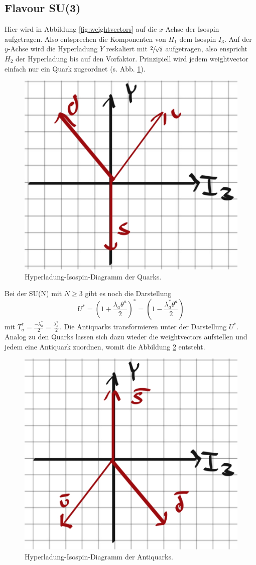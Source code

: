 \documentclass[
  captions=tableheading,  %
  titlepage=firstiscover, %
]{scrartcl}
\begin{document}
\subsection{Flavour SU(3)}
Hier wird in Abbildung \ref{fig:weightvectors} auf die $x$-Achse der Isospin 
aufgetragen.
Also entsprechen die Komponenten von $H_1$ dem Isospin $I_3$.
Auf der $y$-Achse wird die Hyperladung $Y$ reskaliert mit $\sfrac{2}{\sqrt{3}}$ aufgetragen, also enspricht 
$H_2$ der Hyperladung bis auf den Vorfaktor. 
Prinzipiell wird jedem weightvector einfach nur ein Quark zugeordnet (s. Abb. \ref{fig:quark}).
\begin{figure}
  \centering
  \includegraphics[width = 0.35 \textwidth]{Quark.jpg}
  \caption{Hyperladung-Isospin-Diagramm der Quarks.}
  \label{fig:quark}
\end{figure}
Bei der SU(N) mit $N \geq 3$ gibt es noch die Darstellung 
\begin{equation*}
  U^* = (1 + \frac{\lambda_a\theta^a}{2})^* = (1 - \frac{\lambda_a^*\theta^a}{2})
\end{equation*}
mit $T_a^* =\frac{-\lambda_a^*}{2} = \frac{\lambda_a^{\text{T}}}{2}$.
Die Antiquarks transformieren unter der Darstellung $U^*$.
Analog zu den Quarks lassen sich dazu wieder die weightvectors aufstellen und jedem 
eine Antiquark zuordnen, womit die Abbildung \ref{fig:antiquark} entsteht.
\begin{figure}
  \centering
  \includegraphics[width = 0.35 \textwidth]{antiquark.jpg}
  \caption{Hyperladung-Isospin-Diagramm der Antiquarks.}
  \label{fig:antiquark}
\end{figure}
\end{document}
